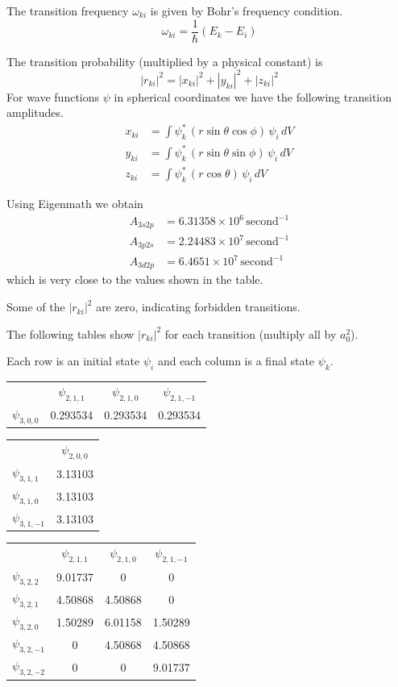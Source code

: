 \documentclass[12pt]{article}
\begin{document}
\noindent
The transition frequency $\omega_{ki}$ is given by Bohr's frequency condition.
\begin{equation*}
\omega_{ki}=\frac{1}{\hbar}(E_k-E_i)
\end{equation*}

\noindent
The transition probability (multiplied by a physical constant) is
\begin{equation*}
|r_{ki}|^2
=|x_{ki}|^2
+|y_{ki}|^2
+|z_{ki}|^2
\end{equation*}
For wave functions $\psi$ in spherical coordinates we have the following transition amplitudes.
\begin{align*}
x_{ki}&=\int\psi_k^*\,(r\sin\theta\cos\phi)\,\psi_i\,dV
\\
y_{ki}&=\int\psi_k^*\,(r\sin\theta\sin\phi)\,\psi_i\,dV
\\
z_{ki}&=\int\psi_k^*\,(r\cos\theta)\,\psi_i\,dV
\end{align*}

\noindent
Using Eigenmath we obtain
\begin{align*}
A_{3s2p}&=6.31358\times10^6\,\text{second}^{-1}
\\
A_{3p2s}&=2.24483\times10^7\,\text{second}^{-1}
\\
A_{3d2p}&=6.4651\times10^7\,\text{second}^{-1}
\end{align*}
which is very close to the values shown in the table.

\bigskip
\noindent
Some of the $|r_{ki}|^2$ are zero, indicating forbidden transitions.

\bigskip
\noindent
The following tables show $|r_{ki}|^2$ for each transition (multiply all by $a_0^2$).

\bigskip
\noindent
Each row is an initial state $\psi_i$ and each column is a final state $\psi_k$.
%
\begin{center}
\begin{tabular}{lccc}
& $\psi_{2,1,1}$ & $\psi_{2,1,0}$ & $\psi_{2,1,-1}$
\\[1ex]
$\psi_{3,0,0}$ & 0.293534 & 0.293534 & 0.293534
\end{tabular}
\end{center}
%
\begin{center}
\begin{tabular}{lc}
& $\psi_{2,0,0}$
\\[1ex]
$\psi_{3,1,1}$ & 3.13103
\\
$\psi_{3,1,0}$ & 3.13103
\\
$\psi_{3,1,-1}$ & 3.13103
\end{tabular}
\end{center}
%
\begin{center}
\begin{tabular}{lccc}
& $\psi_{2,1,1}$ & $\psi_{2,1,0}$ & $\psi_{2,1,-1}$
\\[1ex]
$\psi_{3,2,2}$ & 9.01737 & 0 & 0
\\
$\psi_{3,2,1}$ & 4.50868 & 4.50868 & 0
\\
$\psi_{3,2,0}$ & 1.50289 & 6.01158 & 1.50289
\\
$\psi_{3,2,-1}$ & 0 & 4.50868 & 4.50868
\\
$\psi_{3,2,-2}$ & 0 & 0 & 9.01737
\end{tabular}
\end{center}
\end{document}
